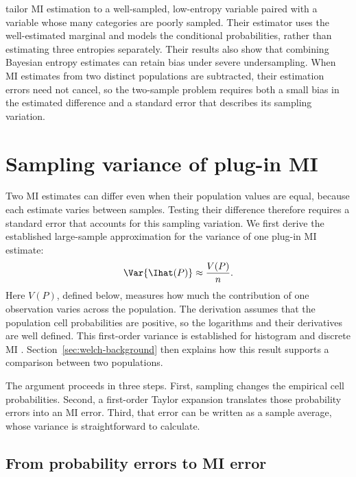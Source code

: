 \citet{hernandez2019} tailor MI estimation to a well-sampled, low-entropy
variable paired with a variable whose many categories are poorly sampled.
Their estimator uses the well-estimated marginal and models the conditional
probabilities, rather than estimating three entropies separately. Their results also
show that combining Bayesian entropy estimates can retain bias under severe
undersampling. When MI estimates from two distinct populations are
subtracted, their estimation errors need not cancel, so the two-sample problem
requires both a small bias in the estimated difference and a standard error
that describes its sampling variation.

\allowdisplaybreaks[0]
\section{Sampling variance of plug-in MI}
\label{sec:first-order-mi-background}

Two MI estimates can differ even when their population values are equal,
because each estimate varies between samples. Testing their difference
therefore requires a standard error that accounts for this sampling
variation. We first derive the established large-sample approximation
for the variance of one plug-in MI estimate:
\begin{equation}
  \Var\{\Ihat(P)\}\approx\frac{V(P)}{n}.
  \label{eq:first-order-mi-var-background}
\end{equation}
Here \(V(P)\), defined below, measures how much the contribution of one
observation varies across the population. The derivation assumes that the
population cell probabilities are positive, so the logarithms and their
derivatives are well defined. This first-order variance is established for
histogram and discrete MI \citep{moddemeijer1989,brillinger2004}.
Section~\ref{sec:welch-background} then explains how this result supports
a comparison between two populations.

The argument proceeds in three steps. First, sampling changes the empirical
cell probabilities. Second, a first-order Taylor expansion translates those
probability errors into an MI error. Third, that error can be written as a
sample average, whose variance is straightforward to calculate.

\subsection{From probability errors to MI error}

